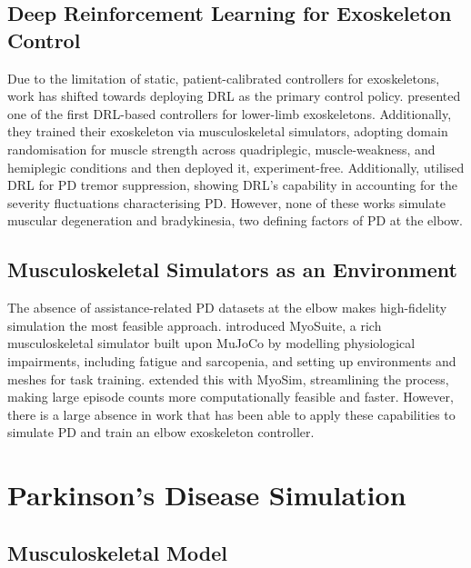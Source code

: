 \documentclass[letterpaper]{article} %
\begin{document}
\subsection{Deep Reinforcement Learning for Exoskeleton Control}

Due to the limitation of static, patient-calibrated controllers for exoskeletons,
work has shifted towards deploying DRL as the primary control policy.
\citet{luo2023} presented one of the first DRL-based controllers for lower-limb
exoskeletons.
Additionally, they trained their exoskeleton via musculoskeletal simulators,
adopting domain randomisation for muscle strength across quadriplegic,
muscle-weakness, and hemiplegic conditions and then deployed it,
experiment-free.
Additionally, \citet{endrei2025} utilised DRL for PD tremor suppression,
showing DRL's capability in accounting for the severity fluctuations
characterising PD.
However, none of these works simulate muscular degeneration and bradykinesia,
two defining factors of PD at the elbow.

\subsection{Musculoskeletal Simulators as an Environment}

The absence of assistance-related PD datasets at the elbow makes high-fidelity
simulation the most feasible approach.
\citet{caggiano2022} introduced MyoSuite, a rich musculoskeletal simulator built
upon MuJoCo by modelling physiological impairments, including fatigue and
sarcopenia, and setting up environments and meshes for task training.
\citet{wang2022} extended this with MyoSim, streamlining the process, making
large episode counts more computationally feasible and faster.
However, there is a large absence in work that has been able to apply these
capabilities to simulate PD and train an elbow exoskeleton controller.

\section{Parkinson's Disease Simulation}
\label{sec:pdsim}

\subsection{Musculoskeletal Model}
\end{document}
